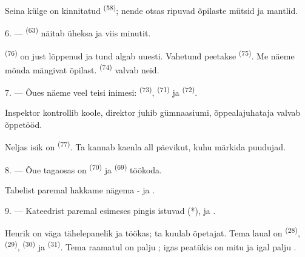 Seina külge on kinnitatud  \textsuperscript{(58)}; nende otsas
ripuvad õpilaste mütsid ja mantlid.

\VUsaut{5.2mm}
\VUsaut{3.6mm}

6. ---  \textsuperscript{(63)} näitab üheksa ja viis minutit.

 \textsuperscript{(76)} on just lõppenud ja tund algab uuesti.
Vahetund peetakse  \textsuperscript{(75)}. Me näeme mõnda mängivat
õpilast.  \textsuperscript{(74)} valvab neid.

7. --- Õues näeme veel teisi inimesi:  \textsuperscript{(73)},
 \textsuperscript{(71)} ja 
\textsuperscript{(72)}.

Inspektor kontrollib koole, direktor juhib gümnaasiumi, õppealajuhataja valvab
õppetööd.

Neljas isik on  \textsuperscript{(77)}. Ta kannab kaenla all
päevikut, kuhu märkida puudujad.

8. --- Õue tagaosas on  \textsuperscript{(70)} ja
 \textsuperscript{(69)} töökoda.

Tabelist paremal hakkame nägema - ja .


\VUsaut{2.4mm}

\VUsaut{3.0mm}

9. --- Kateedrist paremal esimeses pingis istuvad  (*),
 ja .

Henrik on väga tähelepanelik ja töökas; ta kuulab õpetajat. Tema laual on
 \textsuperscript{(28)},  \textsuperscript{(29)},
 \textsuperscript{(30)} ja  \textsuperscript{(31)}.
Tema raamatul on palju ; igas peatükis on mitu  ja
igal  palju .

